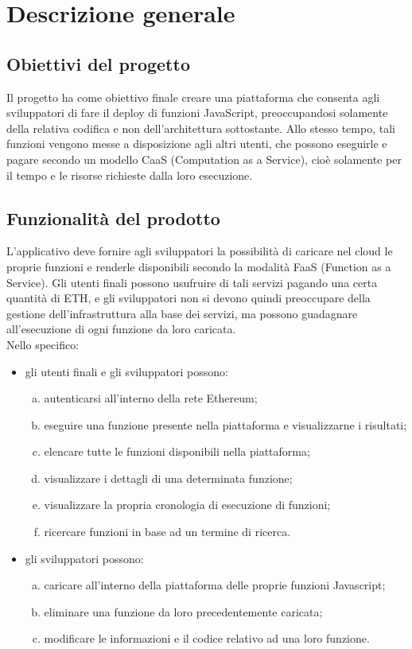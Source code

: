 \section{Descrizione generale}

\subsection{Obiettivi del progetto}
Il progetto \NomeProgetto{} ha come obiettivo finale creare una piattaforma che consenta agli sviluppatori di fare il deploy di funzioni JavaScript, preoccupandosi solamente della relativa codifica e non dell'architettura sottostante. Allo stesso tempo, tali funzioni vengono messe a disposizione agli altri utenti, che possono eseguirle e pagare secondo un modello CaaS (Computation as a Service), cioè solamente per il tempo e le risorse richieste dalla loro esecuzione.

\subsection{Funzionalità del prodotto}
L'applicativo deve fornire agli sviluppatori la possibilità di caricare nel cloud le proprie funzioni e renderle disponibili secondo la modalità FaaS (Function as a Service). Gli utenti finali possono usufruire di tali servizi pagando una certa quantità di ETH, e gli sviluppatori non si devono quindi preoccupare della gestione dell'infrastruttura alla base dei servizi, ma possono guadagnare all'esecuzione di ogni funzione da loro caricata. \\
Nello specifico: 
	\begin{itemize}
		\item gli utenti finali e gli sviluppatori possono:
		\begin{enumerate}[a.]
			\item autenticarsi all'interno della rete Ethereum;
			\item eseguire una funzione presente nella piattaforma e visualizzarne i risultati;
			\item elencare tutte le funzioni disponibili nella piattaforma;
			\item visualizzare i dettagli di una determinata funzione;
			\item visualizzare la propria cronologia di esecuzione di funzioni;
			\item ricercare funzioni in base ad un termine di ricerca.
		\end{enumerate}

		\item gli sviluppatori possono:
		\begin{enumerate}[a.]
			\item caricare all'interno della piattaforma delle proprie funzioni Javascript;
			\item eliminare una funzione da loro precedentemente caricata;
			\item modificare le informazioni e il codice relativo ad una loro funzione.
		\end{enumerate}
	\end{itemize}
